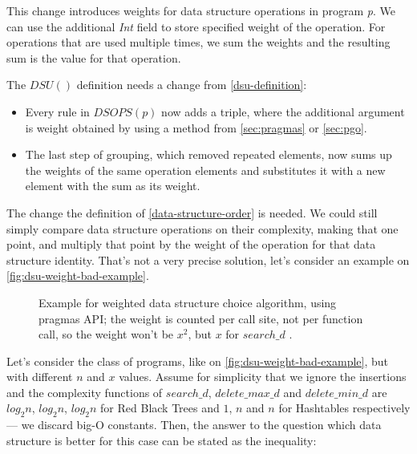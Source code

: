 \documentclass[a4paper,11pt]{article}
\begin{document}
			This change introduces weights for data structure operations in program \emph{p}. We can use the
			additional \emph{Int} field to store specified weight of the operation. For operations that are used
			multiple times, we sum the weights and the resulting sum is the value for that operation.

			The $DSU()$ definition needs a change from \autoref{dsu-definition}:

			\begin{itemize}
				\item Every rule in $DSOPS(p)$ now adds a triple, where the additional argument is
					weight obtained by using a method from \autoref{sec:pragmas} or
					\autoref{sec:pgo}.

				\item The last step of grouping, which removed repeated elements, now sums up the weights
					of the same operation elements and substitutes it with a new element with the
					sum as its weight.
			\end{itemize}

            The change the definition of \autoref{data-structure-order} is needed. We could still simply compare data
            structure operations on their complexity, making that one point, and multiply that point by the weight of
            the operation for that data structure identity. That's not a very precise solution, let's consider an
            example on \autoref{fig:dsu-weight-bad-example}.

            \begin{figure}[!h]
                

                \caption{Example for weighted data structure choice algorithm, using pragmas API; the weight is
                counted per call site, not per function call, so the weight won't be $x^2$, but $x$ for $search\_d$ .}

                \label{fig:dsu-weight-bad-example}
            \end{figure}

            Let's consider the class of programs, like on \autoref{fig:dsu-weight-bad-example}, but with different $n$
            and $x$ values. Assume for simplicity that we ignore the insertions and the complexity functions of $search\_d$,
            $delete\_max\_d$ and $delete\_min\_d$ are $log_2 n$, $log_2 n$, $log_2 n$ for Red Black Trees and $1$, $n$ and $n$
            for Hashtables respectively --- we discard big-O constants. Then, the answer to the question which data structure 
            is better for this case can be stated as the inequality:
\end{document}
